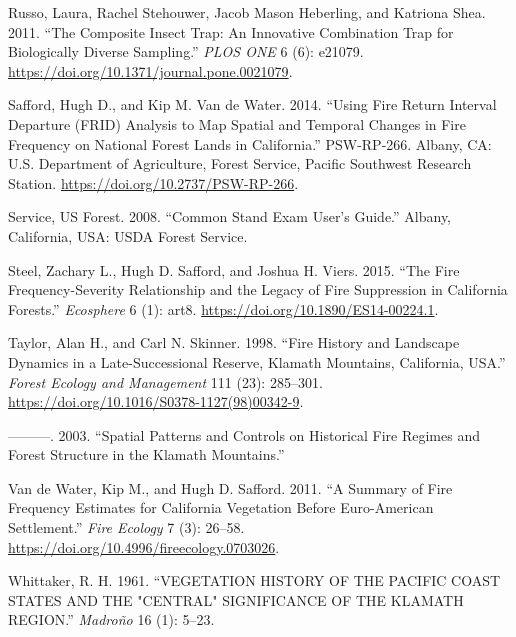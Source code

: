 \documentclass[]{article}
\begin{document}
\leavevmode\hypertarget{ref-russoCompositeInsectTrap2011}{}%
Russo, Laura, Rachel Stehouwer, Jacob Mason Heberling, and Katriona
Shea. 2011. ``The Composite Insect Trap: An Innovative Combination Trap
for Biologically Diverse Sampling.'' \emph{PLOS ONE} 6 (6): e21079.
\url{https://doi.org/10.1371/journal.pone.0021079}.

\leavevmode\hypertarget{ref-saffordUsingFireReturn2014}{}%
Safford, Hugh D., and Kip M. Van de Water. 2014. ``Using Fire Return
Interval Departure (FRID) Analysis to Map Spatial and Temporal Changes
in Fire Frequency on National Forest Lands in California.'' PSW-RP-266.
Albany, CA: U.S. Department of Agriculture, Forest Service, Pacific
Southwest Research Station. \url{https://doi.org/10.2737/PSW-RP-266}.

\leavevmode\hypertarget{ref-usforestserviceCommonStandExam2008}{}%
Service, US Forest. 2008. ``Common Stand Exam User's Guide.'' Albany,
California, USA: USDA Forest Service.

\leavevmode\hypertarget{ref-steelFireFrequencyseverityRelationship2015}{}%
Steel, Zachary L., Hugh D. Safford, and Joshua H. Viers. 2015. ``The
Fire Frequency-Severity Relationship and the Legacy of Fire Suppression
in California Forests.'' \emph{Ecosphere} 6 (1): art8.
\url{https://doi.org/10.1890/ES14-00224.1}.

\leavevmode\hypertarget{ref-taylorFireHistoryLandscape1998}{}%
Taylor, Alan H., and Carl N. Skinner. 1998. ``Fire History and Landscape
Dynamics in a Late-Successional Reserve, Klamath Mountains, California,
USA.'' \emph{Forest Ecology and Management} 111 (23): 285--301.
\url{https://doi.org/10.1016/S0378-1127(98)00342-9}.

\leavevmode\hypertarget{ref-taylorSpatialPatternsControls2003a}{}%
---------. 2003. ``Spatial Patterns and Controls on Historical Fire
Regimes and Forest Structure in the Klamath Mountains.''

\leavevmode\hypertarget{ref-vandewaterSummaryFireFrequency2011}{}%
Van de Water, Kip M., and Hugh D. Safford. 2011. ``A Summary of Fire
Frequency Estimates for California Vegetation Before Euro-American
Settlement.'' \emph{Fire Ecology} 7 (3): 26--58.
\url{https://doi.org/10.4996/fireecology.0703026}.

\leavevmode\hypertarget{ref-whittakerVEGETATIONHISTORYPACIFIC1961}{}%
Whittaker, R. H. 1961. ``VEGETATION HISTORY OF THE PACIFIC COAST STATES
AND THE "CENTRAL" SIGNIFICANCE OF THE KLAMATH REGION.'' \emph{Madroño}
16 (1): 5--23.
\end{document}
